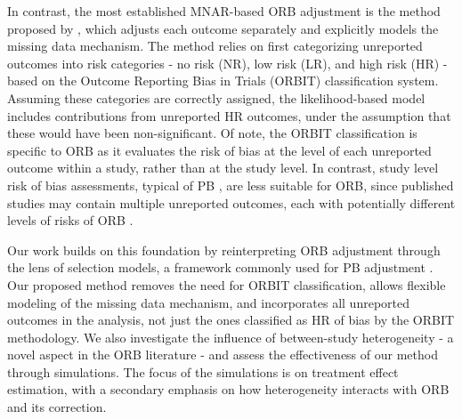 \documentclass[twocolumn]{article}\usepackage[]{graphicx}\usepackage[]{xcolor}
\begin{document}
In contrast, the most established MNAR-based ORB adjustment is the method proposed by \citet{Copas2019, Copas2014}, which adjusts each outcome separately and explicitly models the missing data mechanism. The method relies on first categorizing unreported outcomes into risk categories - no risk (NR), low risk (LR), and high risk (HR) - based on the Outcome Reporting Bias in Trials (ORBIT) classification system. Assuming these categories are correctly assigned, the likelihood-based model includes contributions from unreported HR outcomes, under the assumption that these would have been non-significant. Of note, the ORBIT classification is specific to ORB as it evaluates the risk of bias at the level of each unreported outcome within a study, rather than at the study level. In contrast, study level risk of bias assessments, typical of PB \citep{Lunny2024,RiskBias, Begg, Salanti}, are less suitable for ORB, since published studies may contain multiple unreported outcomes, each with potentially different levels of risks of ORB \citep{Copas2019, Copas2014, Kirkham2012}.

Our work builds on this foundation by reinterpreting ORB adjustment through the lens of selection models, a framework commonly used for PB adjustment \citep{selection2, selection1, reviewselection}. Our proposed method removes the need for ORBIT classification, allows flexible modeling of the missing data mechanism, and incorporates all unreported outcomes in the analysis, not just the ones classified as HR of bias by the ORBIT methodology. We also investigate the influence of between-study heterogeneity - a novel aspect in the ORB literature - and assess the effectiveness of our method through simulations. The focus of the simulations is on treatment effect estimation, with a secondary emphasis on how heterogeneity interacts with ORB and its correction. 

\end{document}
